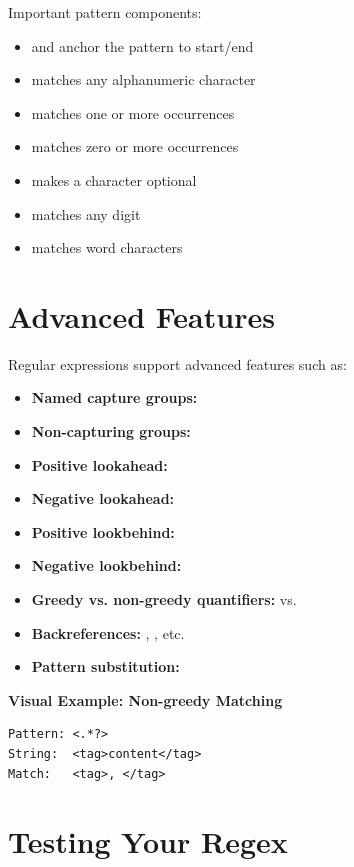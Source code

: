 Important pattern components:
\begin{itemize}
    \item \code{\string^} and \code{\string$} anchor the pattern to start/end
    \item \code{[a-zA-Z0-9]} matches any alphanumeric character
    \item \code{+} matches one or more occurrences
    \item \code{*} matches zero or more occurrences
    \item {} makes a character optional
    \item {} matches any digit
    \item {} matches word characters
\end{itemize}

\section{Advanced Features}

Regular expressions support advanced features such as:

\begin{itemize}
    \item \textbf{Named capture groups:} 
    \item \textbf{Non-capturing groups:} 
    \item \textbf{Positive lookahead:} 
    \item \textbf{Negative lookahead:} 
    \item \textbf{Positive lookbehind:} 
    \item \textbf{Negative lookbehind:} 
    \item \textbf{Greedy vs. non-greedy quantifiers:} \code{*} vs. 
    \item \textbf{Backreferences:} , , etc.
    \item \textbf{Pattern substitution:} 
\end{itemize}

\textbf{Visual Example: Non-greedy Matching}

\begin{verbatim}
Pattern: <.*?>
String:  <tag>content</tag>
Match:   <tag>, </tag>
\end{verbatim}

\section{Testing Your Regex}

